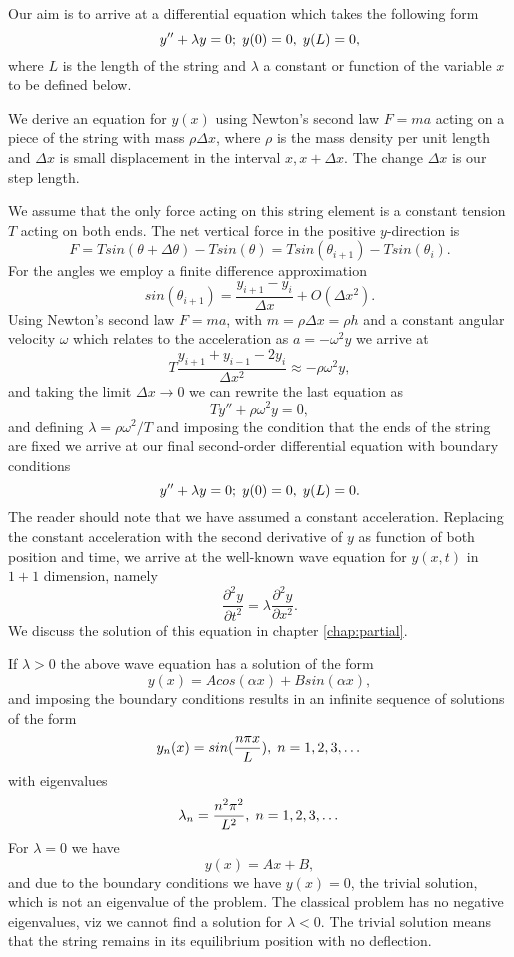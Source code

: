 Our aim is to arrive at a differential equation which takes the following form
\[
   y''+\lambda y=0; \hspace{0.1cm} y(0) =0, \hspace{0.1cm}  y(L) = 0,
\]
where $L$ is the length of the string and $\lambda$ a constant or function of the variable $x$
to be defined below. 

We derive an equation for $y(x)$ using Newton's second law $F=ma$ acting on a piece of the string
with mass $\rho\Delta x$, where $\rho$ is the mass density per unit length and $\Delta x$ is  small
displacement in the interval $x,x+\Delta x$.  The change $\Delta x$ is our step length. 

We assume that the only force acting on this string element is a constant tension $T$ acting 
on both ends. The net vertical force in the positive $y$-direction is 
\[ 
    F = T sin(\theta+\Delta\theta)- Tsin(\theta)=T sin(\theta_{i+1})- Tsin(\theta_i).
\]
For the angles we employ  a finite difference approximation
\[
sin(\theta_{i+1}) = \frac{y_{i+1}-y_i}{\Delta x}+O(\Delta x^2).
\]
Using Newton's second law $F=ma$, with
$m=\rho\Delta x=\rho h$ and a constant angular velocity $\omega$ which relates to the acceleration as
$a=-\omega^2y$ we arrive at 
\[ 
   T \frac{y_{i+1}+y_{i-1}-2y_i}{\Delta x^2} \approx -\rho\omega^2y,
\]
and taking the limit $\Delta x\rightarrow 0$ we can rewrite the last equation as
\[
Ty''+ \rho\omega^2y = 0,
\]
and defining $\lambda = \rho\omega^2/T$ and imposing the condition 
that the ends of the string are fixed we arrive at our 
final second-order differential equation with boundary conditions
\[
   y''+\lambda y=0; \hspace{0.1cm} y(0) =0, \hspace{0.1cm}  y(L) = 0.
\]
The reader should note that we have assumed a constant acceleration.
Replacing the constant acceleration with the second derivative of $y$ as function of
both position and time, we arrive at the well-known wave equation for $y(x,t)$ in $1+1$ dimension, namely
\[ 
   \frac{\partial^2 y}{\partial t^2} = \lambda \frac{\partial^2 y}{\partial x^2}.
\]
We discuss the solution of this equation in chapter \ref{chap:partial}.
 
If $\lambda > 0$ 
the above wave equation has a solution of the form 
\[
   y(x) = Acos(\alpha x) + Bsin(\alpha x),
\]
and imposing the boundary conditions results in an infinite sequence of solutions of the form
\[
  y_n(x) = sin(\frac{n\pi x}{L}), \hspace{0.1cm} n=1,2,3,\dots
\]
with eigenvalues
\[
   \lambda_n = \frac{n^2\pi^2}{L^2}, \hspace{0.1cm} n=1,2,3,\dots
\]
For $\lambda=0$ we have 
\[
 y(x) = Ax+B,
\]
and due to the boundary conditions we have $y(x)=0$, the trivial solution, which is not an eigenvalue
of the problem. The classical problem has no negative eigenvalues, viz we cannot find a solution
for $\lambda < 0$. The trivial solution means that the string remains in its equilibrium position
with no deflection. 


